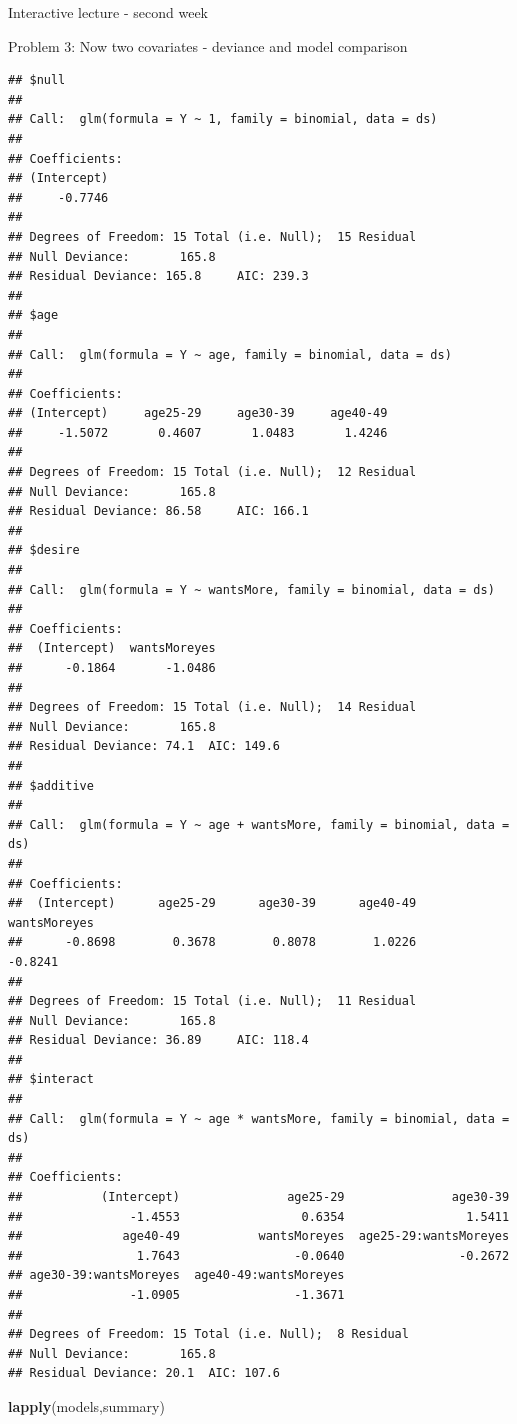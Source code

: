 \documentclass[
  ignorenonframetext,
]{beamer}
\newenvironment{Shaded}{\begin{snugshade}}{\end{snugshade}}
\newcommand{\FunctionTok}[1]{\textcolor[rgb]{0.13,0.29,0.53}{\textbf{#1}}}
\newcommand{\NormalTok}[1]{#1}
\begin{document}
\begin{frame}[fragile]{Interactive lecture - second week}
\begin{block}{Problem 3: Now two covariates - deviance and model
comparison}
\begin{verbatim}
## $null
## 
## Call:  glm(formula = Y ~ 1, family = binomial, data = ds)
## 
## Coefficients:
## (Intercept)  
##     -0.7746  
## 
## Degrees of Freedom: 15 Total (i.e. Null);  15 Residual
## Null Deviance:       165.8 
## Residual Deviance: 165.8     AIC: 239.3
## 
## $age
## 
## Call:  glm(formula = Y ~ age, family = binomial, data = ds)
## 
## Coefficients:
## (Intercept)     age25-29     age30-39     age40-49  
##     -1.5072       0.4607       1.0483       1.4246  
## 
## Degrees of Freedom: 15 Total (i.e. Null);  12 Residual
## Null Deviance:       165.8 
## Residual Deviance: 86.58     AIC: 166.1
## 
## $desire
## 
## Call:  glm(formula = Y ~ wantsMore, family = binomial, data = ds)
## 
## Coefficients:
##  (Intercept)  wantsMoreyes  
##      -0.1864       -1.0486  
## 
## Degrees of Freedom: 15 Total (i.e. Null);  14 Residual
## Null Deviance:       165.8 
## Residual Deviance: 74.1  AIC: 149.6
## 
## $additive
## 
## Call:  glm(formula = Y ~ age + wantsMore, family = binomial, data = ds)
## 
## Coefficients:
##  (Intercept)      age25-29      age30-39      age40-49  wantsMoreyes  
##      -0.8698        0.3678        0.8078        1.0226       -0.8241  
## 
## Degrees of Freedom: 15 Total (i.e. Null);  11 Residual
## Null Deviance:       165.8 
## Residual Deviance: 36.89     AIC: 118.4
## 
## $interact
## 
## Call:  glm(formula = Y ~ age * wantsMore, family = binomial, data = ds)
## 
## Coefficients:
##           (Intercept)               age25-29               age30-39  
##               -1.4553                 0.6354                 1.5411  
##              age40-49           wantsMoreyes  age25-29:wantsMoreyes  
##                1.7643                -0.0640                -0.2672  
## age30-39:wantsMoreyes  age40-49:wantsMoreyes  
##               -1.0905                -1.3671  
## 
## Degrees of Freedom: 15 Total (i.e. Null);  8 Residual
## Null Deviance:       165.8 
## Residual Deviance: 20.1  AIC: 107.6
\end{verbatim}

\begin{Shaded}
\begin{Highlighting}[]
\FunctionTok{lapply}\NormalTok{(models,summary)}
\end{Highlighting}
\end{Shaded}


\end{block}
\end{frame}
\end{document}

